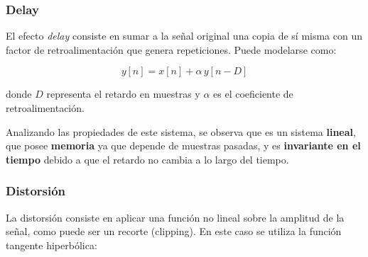\documentclass[12pt]{article}
\begin{document}
\subsubsection{Delay}

El efecto \textit{delay} consiste en sumar a la señal original una copia de sí misma con un factor de retroalimentación que genera repeticiones. Puede modelarse como:

\[
y[n] = x[n] + \alpha\, y[n - D]
\]

donde $D$ representa el retardo en muestras y $\alpha$ es el coeficiente de retroalimentación.

Analizando las propiedades de este sistema, se observa que es un sistema \textbf{lineal}, que posee \textbf{memoria} ya que depende de muestras pasadas, y es \textbf{invariante en el tiempo} debido a que el retardo no cambia a lo largo del tiempo.

\subsubsection{Distorsión}

La distorsión consiste en aplicar una función no lineal sobre la amplitud de la señal, como puede ser un recorte (clipping). En este caso se utiliza la función tangente hiperbólica:
\end{document}
